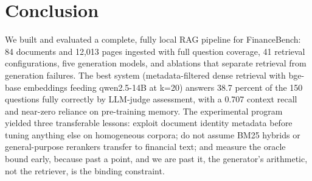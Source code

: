 \documentclass[
  11pt,
]{article}
\begin{document}
\section{Conclusion}\label{conclusion}

We built and evaluated a complete, fully local RAG pipeline for
FinanceBench: 84 documents and 12,013 pages ingested with full question
coverage, 41 retrieval configurations, five generation models, and
ablations that separate retrieval from generation failures. The best
system (metadata-filtered dense retrieval with bge-base embeddings
feeding qwen2.5-14B at k=20) answers 38.7 percent of the 150 questions
fully correctly by LLM-judge assessment, with a 0.707 context recall and
near-zero reliance on pre-training memory. The experimental program
yielded three transferable lessons: exploit document identity metadata
before tuning anything else on homogeneous corpora; do not assume BM25
hybrids or general-purpose rerankers transfer to financial text; and
measure the oracle bound early, because past a point, and we are past
it, the generator's arithmetic, not the retriever, is the binding
constraint.
\end{document}
